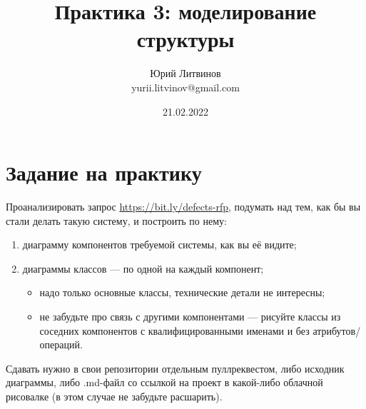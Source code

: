 \documentclass[a5paper]{article}
\title{Практика 3: моделирование структуры}
\author{Юрий Литвинов\\\small{yurii.litvinov@gmail.com}}
\date{21.02.2022}
\begin{document}
\maketitle
\thispagestyle{empty}

\section{Задание на практику}

Проанализировать запрос \url{https://bit.ly/defects-rfp}, подумать над тем, как бы вы стали делать такую систему, и построить по нему:

\begin{enumerate}
    \item диаграмму компонентов требуемой системы, как вы её видите;
    \item диаграммы классов --- по одной на каждый компонент;
    \begin{itemize}
        \item надо только основные классы, технические детали не интересны;
        \item не забудьте про связь с другими компонентами --- рисуйте классы из соседних компонентов с квалифицированными именами и без атрибутов/операций.
    \end{itemize}
\end{enumerate}

Сдавать нужно в свои репозитории отдельным пуллреквестом, либо исходник диаграммы, либо .md-файл со ссылкой на проект в какой-либо облачной рисовалке (в этом случае не забудьте расшарить).
\end{document}
